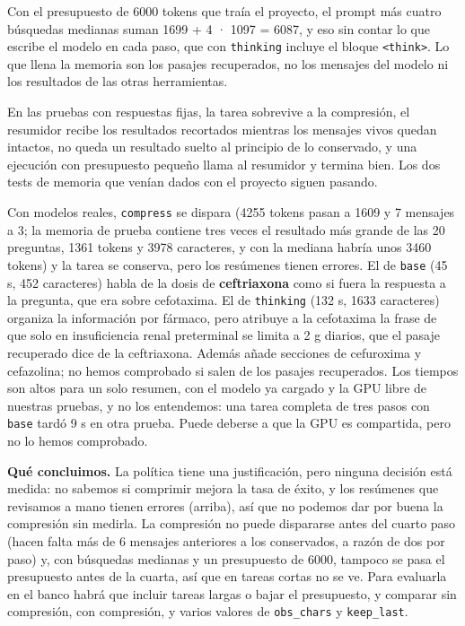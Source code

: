 Con el presupuesto de 6000 tokens que traía el proyecto, el prompt más cuatro búsquedas medianas
suman 1699 + 4 · 1097 = 6087, y eso sin contar lo que escribe el modelo en cada paso, que con
\texttt{thinking} incluye el bloque \texttt{\textless{}think\textgreater{}}. Lo que llena la memoria son los pasajes recuperados, no los
mensajes del modelo ni los resultados de las otras herramientas.

En las pruebas con respuestas fijas, la tarea sobrevive a la compresión, el resumidor recibe los
resultados recortados mientras los mensajes vivos quedan intactos, no queda un resultado suelto al
principio de lo conservado, y una ejecución con presupuesto pequeño llama al resumidor y termina bien.
Los dos tests de memoria que venían dados con el proyecto siguen pasando.

Con modelos reales, \texttt{compress} se dispara (4255 tokens pasan a 1609 y 7 mensajes a 3; la memoria de
prueba contiene tres veces el resultado más grande de las 20 preguntas, 1361 tokens y 3978
caracteres, y con la mediana habría unos 3460 tokens) y la tarea se conserva, pero los resúmenes tienen errores. El de \texttt{base} (45 s, 452 caracteres) habla de la dosis
de \textbf{ceftriaxona} como si fuera la respuesta a la pregunta, que era sobre cefotaxima. El de
\texttt{thinking} (132 s, 1633 caracteres) organiza la información por fármaco, pero atribuye a la cefotaxima
la frase de que solo en insuficiencia renal preterminal se limita a 2 g diarios, que el pasaje
recuperado dice de la ceftriaxona. Además añade secciones de cefuroxima y cefazolina; no hemos
comprobado si salen de los pasajes recuperados. Los tiempos son altos para un solo resumen, con el
modelo ya cargado y la GPU libre de nuestras pruebas, y no los entendemos: una tarea completa de tres
pasos con \texttt{base} tardó 9 s en otra prueba. Puede deberse a que la GPU es compartida, pero no lo hemos
comprobado.

\textbf{Qué concluimos.} La política tiene una justificación, pero ninguna decisión está medida: no sabemos
si comprimir mejora la tasa de éxito, y los resúmenes que revisamos a mano tienen errores (arriba), así que no podemos dar por buena la compresión sin medirla. La
compresión no puede dispararse antes del cuarto paso (hacen falta más de 6 mensajes anteriores a los
conservados, a razón de dos por paso) y, con búsquedas medianas y un presupuesto de 6000, tampoco se pasa
el presupuesto antes de la cuarta, así que en tareas cortas no se ve. Para evaluarla en el banco habrá que incluir tareas largas o bajar el presupuesto, y
comparar sin compresión, con compresión, y varios valores de \texttt{obs\_\allowbreak{}chars} y \texttt{keep\_\allowbreak{}last}.

